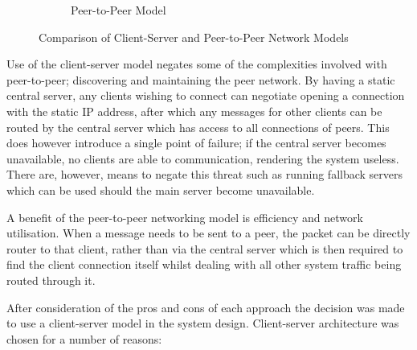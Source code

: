 \begin{figure}[!htbp]
\begin{subfigure}[b]{0.35\textwidth}
		\caption{Peer-to-Peer Model}
		\label{subfig:peer-to-peer}
	\end{subfigure}
	\caption{Comparison of Client-Server and Peer-to-Peer Network Models}
	\label{fig:network_models}
\end{figure}

Use of the client-server model negates some of the complexities involved with peer-to-peer; discovering and maintaining the peer network.  By having a static central server, any clients wishing to connect can negotiate opening a connection with the static IP address, after which any messages for other clients can be routed by the central server which has access to all connections of peers.  This does however introduce a single point of failure;  if the central server becomes unavailable, no clients are able to communication, rendering the system useless.  There are, however, means to negate this threat such as running fallback servers which can be used should the main server become unavailable.

A benefit of the peer-to-peer networking model is efficiency and network utilisation.  When a message needs to be sent to a peer, the packet can be directly router to that client, rather than via the central server which is then required to find the client connection itself whilst dealing with all other system traffic being routed through it.

After consideration of the pros and cons of each approach the decision was made to use a client-server model in the system design.  Client-server architecture was chosen for a number of reasons:

